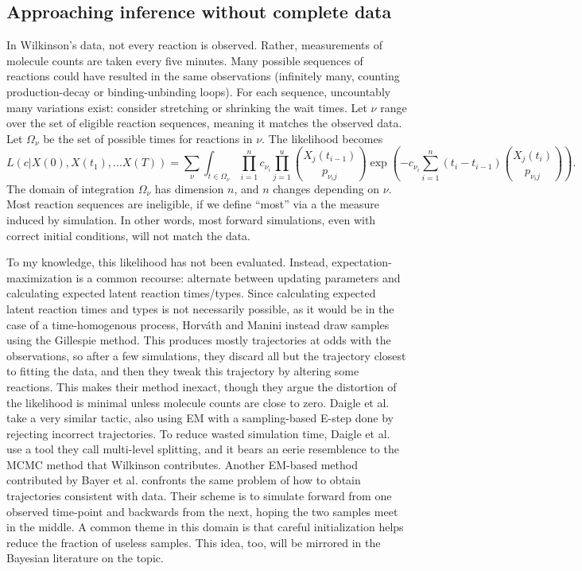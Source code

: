\documentclass{article}
\begin{document}
\subsection{Approaching inference without complete data}
\label{sec:intro_em}
In Wilkinson's data, not every reaction is observed. Rather, measurements of molecule counts are taken every five minutes. Many possible sequences of reactions could have resulted in the same observations (infinitely many, counting production-decay or binding-unbinding loops). For each sequence, uncountably many variations exist: consider stretching or shrinking the wait times. Let $\nu$ range over the set of eligible reaction sequences, meaning it matches the observed data. Let $\Omega_{\nu}$ be the set of possible times for reactions in $\nu$. The likelihood becomes 
\begin{equation}\label{eqn_nasty_lik}
L(c|X(0), X(t_1), ... X(T)) =\sum_{\nu}\int_{t\in \Omega_{\nu}} \prod_{i=1}^n c_{\nu_{i}} \prod_{j=1}^u {{X_{j}(t_{i-1})}\choose{p_{{\nu_{i}}j}}}\exp\left(-c_{\nu_{i}}\sum_{i=1}^{n} (t_{i}-t_{i-1}) {{X_j(t_{i})}\choose{p_{{\nu_{i}}j}}}\right).
\end{equation}
 The domain of integration $\Omega_{\nu}$ has dimension $n$, and $n$ changes depending on $\nu$. Most reaction sequences are ineligible, if we define ``most'' via a the measure induced by simulation. In other words, most forward simulations, even with correct initial conditions, will not match the data. 

To my knowledge, this likelihood has not been evaluated. Instead, expectation-maximization is a common recourse: alternate between updating parameters and calculating expected latent reaction times/types. Since calculating expected latent reaction times and types is not necessarily possible, as it would be in the case of a time-homogenous process, Horv\'ath and Manini \cite{horvath2008parameter} instead draw samples using the Gillespie method. This produces mostly trajectories at odds with the observations, so after a few simulations, they discard all but the trajectory closest to fitting the data, and then they tweak this trajectory by altering some reactions. This makes their method inexact, though they argue the distortion of the likelihood is minimal unless molecule counts are close to zero. Daigle et al. \cite{daigle2012accelerated} take a very similar tactic, also using EM with a sampling-based E-step done by rejecting incorrect trajectories. To reduce wasted simulation time, Daigle et al. use a tool they call multi-level splitting, and it bears an eerie resemblence to the MCMC method that Wilkinson contributes.  Another EM-based method contributed by Bayer et al. \cite{bayer2015stoch_em} confronts the same problem of how to obtain trajectories consistent with data. Their scheme is to simulate forward from one observed time-point and backwards from the next, hoping the two samples meet in the middle. A common theme in this domain is that careful initialization helps reduce the fraction of useless samples. This idea, too, will be mirrored in the Bayesian literature on the topic.
\end{document}
